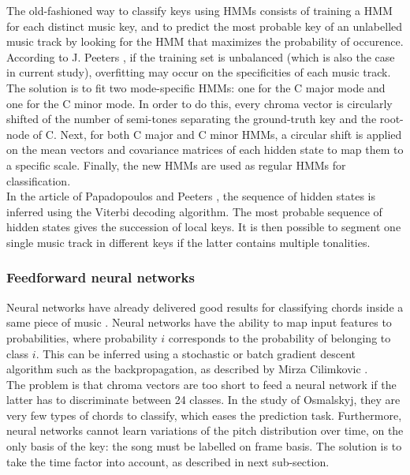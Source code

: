 \documentclass[letterpaper]{article}
\begin{document}
The old-fashioned way to classify keys using HMMs consists of training a HMM for each distinct music key, and to predict the most probable 
key of an unlabelled music track by looking for the HMM that maximizes the probability of occurence.  \\

According to J. Peeters \citep{JP}, if the training set is unbalanced (which is also the case in current study), overfitting may occur on the specificities
of each music track. The solution is to fit two mode-specific HMMs: one for the C major mode and one for the C minor mode. In order to do this, every chroma vector is circularly shifted of the number of semi-tones separating the ground-truth key and the root-node of C. Next, for both C major and C minor HMMs, a circular shift is applied on the mean vectors and covariance matrices of each hidden state to map them to a specific scale. Finally, the new HMMs are used as regular HMMs for classification.\\

In the article of Papadopoulos and Peeters \citep{PP}, the sequence of hidden states is inferred using the Viterbi decoding algorithm. The most probable sequence of hidden states gives the succession of local keys. It is then possible to segment one single music track in different keys if the latter contains multiple tonalities.

\subsubsection{Feedforward neural networks}

Neural networks have already delivered good results for classifying chords inside a same piece of music \citep{JO}. Neural networks have the ability to map
input features to probabilities, where probability $i$ corresponds to the probability of belonging to class $i$. This can be inferred using a stochastic or batch
gradient descent algorithm such as the backpropagation, as described by Mirza Cilimkovic \citep{BACK}.\\

The problem is that chroma vectors are too short to feed a neural network if the latter has to discriminate between 24 classes. In the study of Osmalskyj, 
they are very few types of chords to classify, which eases the prediction task. Furthermore, neural networks cannot learn variations of the pitch distribution over time, on the only basis of the key: the song must be labelled on frame basis. The solution is to take the time factor into account, as described in next sub-section.
\end{document}
